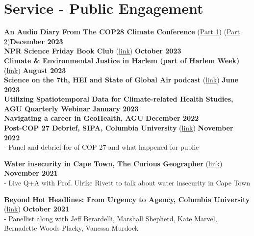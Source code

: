 \section*{Service - Public Engagement}

\noindent \textbf{An Audio Diary From The COP28 Climate Conference} (\href{https://www.ehn.org/cop28-climate-change-health-2666576771.html}{Part 1}) (\href{https://www.ehn.org/cop28-climate-change-podcast-2666576699.html}{Part 2})\hfill \textbf{December 2023} \\

\noindent \textbf{NPR Science Friday Book Club} (\href{https://www.youtube.com/watch?v=6246zQ8UsJw}{link}) \hfill \textbf{October 2023} \\

\noindent \textbf{Climate \& Environmental Justice in Harlem (part of Harlem Week)} (\href{https://twitter.com/columbiaclimate/status/1689358606766850049}{link}) \hfill \textbf{August 2023} \\

\noindent \textbf{Science on the 7th, HEI and State of Global Air podcast} (\href{https://twitter.com/HEISoGA/status/1677316539765104640}{link}) \hfill \textbf{June 2023} \\

\noindent \textbf{Utilizing Spatiotemporal Data for Climate-related Health Studies, AGU Quarterly Webinar} \hfill \textbf{January 2023}\\

\noindent \textbf{Navigating a career in GeoHealth, AGU} \hfill \textbf{December 2022} \\

\noindent \textbf{Post-COP 27 Debrief, SIPA, Columbia University} (\href{https://events.columbia.edu/cal/event/showEventMore.rdo}{link}) \hfill \textbf{November 2022}\\
\noindent - Panel and debrief for of COP 27 and what happened for public 
\medskip

\noindent \textbf{Water insecurity in Cape Town, The Curious Geographer} (\href{https://www.youtube.com/watch?v=5T58BXv41sE}{link}) \hfill \textbf{November 2021}\\
\noindent - Live Q+A with Prof. Ulrike Rivett to talk about water insecurity in Cape Town \medskip

\noindent \textbf{Beyond Hot Headlines: From Urgency to Agency, Columbia University} (\href{https://www.youtube.com/watch?v=4PMs3LOD13k}{link}) \hfill \textbf{October 2021}\\
\noindent - Panellist along with Jeff Berardelli, Marshall Shepherd, Kate Marvel, Bernadette Woods Placky, Vanessa Murdock \medskip

